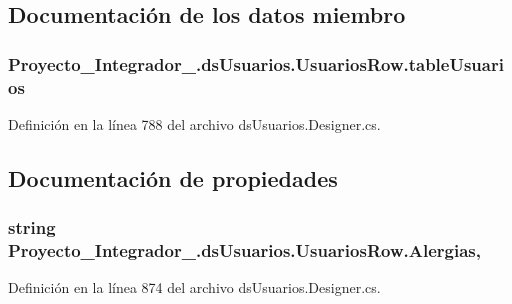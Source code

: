 \subsection{Documentación de los datos miembro}
\hypertarget{class_proyecto___integrador__3_1_1ds_usuarios_1_1_usuarios_row_aafda5a6bdd7b0b2149e77517e78f56d2}{
\subsubsection[{table\-Usuarios}]{ Proyecto\-\_\-\-Integrador\-\_.\-ds\-Usuarios.\-Usuarios\-Row.\-table\-Usuarios\hspace{0.3cm}{\ttfamily [private]}}}\label{class_proyecto___integrador__3_1_1ds_usuarios_1_1_usuarios_row_aafda5a6bdd7b0b2149e77517e78f56d2}


Definición en la línea 788 del archivo ds\-Usuarios.\-Designer.\-cs.



\subsection{Documentación de propiedades}
\hypertarget{class_proyecto___integrador__3_1_1ds_usuarios_1_1_usuarios_row_ac7fdabb96c11d7f4fec61e676d01f897}{
\subsubsection[{Alergias}]{\setlength{\rightskip}{0pt plus 5cm}string Proyecto\-\_\-\-Integrador\-\_.\-ds\-Usuarios.\-Usuarios\-Row.\-Alergias\hspace{0.3cm}{\ttfamily [get]}, {\ttfamily [set]}}}\label{class_proyecto___integrador__3_1_1ds_usuarios_1_1_usuarios_row_ac7fdabb96c11d7f4fec61e676d01f897}


Definición en la línea 874 del archivo ds\-Usuarios.\-Designer.\-cs.

